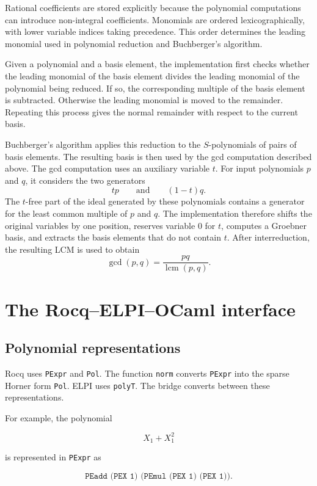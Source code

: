 \documentclass[11pt]{article}
\begin{document}
Rational coefficients are stored explicitly because the polynomial
computations can introduce non-integral coefficients. Monomials are ordered
lexicographically, with lower variable indices taking precedence. This order
determines the leading monomial used in polynomial reduction and
Buchberger's algorithm.


Given a polynomial and a basis element, the implementation first
checks whether the leading monomial of the basis element divides the leading
monomial of the polynomial being reduced. If so, the corresponding multiple
of the basis element is subtracted. Otherwise the leading monomial is moved
to the remainder. Repeating this process gives the normal remainder with
respect to the current basis.

Buchberger's algorithm applies this reduction to the $S$-polynomials of pairs
of basis elements. The resulting basis is then used by the gcd computation
described above.
The gcd computation uses an auxiliary variable $t$. For input polynomials $p$
and $q$, it considers the two generators
\[
  t p \qquad\text{and}\qquad (1-t)q.
\]
The $t$-free part of the ideal generated by these polynomials contains a
generator for the least common multiple of $p$ and $q$. The implementation
therefore shifts the original variables by one position, reserves variable $0$
for $t$, computes a Groebner basis, and extracts the basis elements that do not
contain $t$. After interreduction, the resulting LCM is used to obtain
\[
  \gcd(p,q)=\frac{p q}{\operatorname{lcm}(p,q)}.
\]


\section{The Rocq--ELPI--OCaml interface}
\subsection{Polynomial representations}
Rocq uses \texttt{PExpr} and \texttt{Pol}. The function \texttt{norm} converts
\texttt{PExpr} into the sparse Horner form \texttt{Pol}. ELPI uses
\texttt{polyT}. The bridge converts between these representations.


For example, the polynomial

$$
  X_1+X_1^2
$$

is represented in \texttt{PExpr} as

$$
  \texttt{PEadd (PEX 1) (PEmul (PEX 1) (PEX 1))}.
$$
\end{document}
